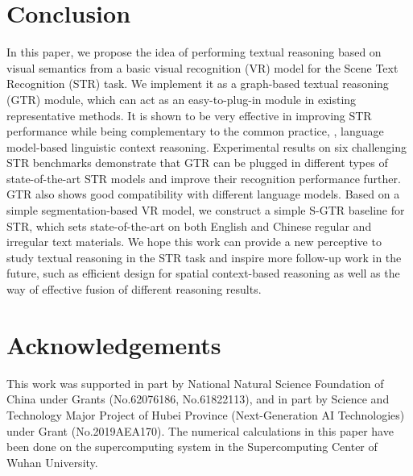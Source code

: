 \documentclass[letterpaper]{article} \usepackage{aaai22}  \usepackage{times}  \usepackage{helvet}  \usepackage{courier}  \usepackage[hyphens]{url}  \usepackage{graphicx} \urlstyle{rm} \def\UrlFont{\rm}  \usepackage{natbib}  \usepackage{caption} \DeclareCaptionStyle{ruled}{labelfont=normalfont,labelsep=colon,strut=off} \frenchspacing  \setlength{\pdfpagewidth}{8.5in}  \setlength{\pdfpageheight}{11in}
\begin{document}
\section{Conclusion}
In this paper, we propose the idea of performing textual reasoning based on visual semantics from a basic visual recognition (VR) model for the Scene Text Recognition (STR) task. We implement it as a graph-based textual reasoning (GTR) module, which can act as an easy-to-plug-in module in existing representative methods. It is shown to be very effective in improving STR performance while being complementary to the common practice, , language model-based linguistic context reasoning. Experimental results on six challenging STR benchmarks demonstrate that GTR can be plugged in different types of state-of-the-art STR models and improve their recognition performance further. GTR also shows good compatibility with different language models. Based on a simple segmentation-based VR model, we construct a simple S-GTR baseline for STR, which sets state-of-the-art on both English and Chinese regular and irregular text materials. We hope this work can provide a new perceptive to study textual reasoning in the STR task and inspire more follow-up work in the future, such as efficient design for spatial context-based reasoning as well as the way of effective fusion of different reasoning results.

\section*{Acknowledgements}
This work was supported in part by National Natural Science Foundation of China under Grants (No.62076186, No.61822113), and in part by Science and Technology Major Project of Hubei Province (Next-Generation AI Technologies) under Grant (No.2019AEA170). The numerical calculations in this paper have been done on the supercomputing system in the Supercomputing Center of Wuhan University.




\end{document}
